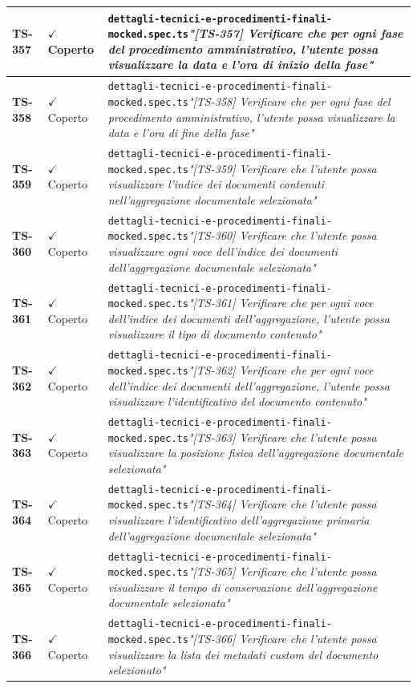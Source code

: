 \documentclass[a4paper,12pt]{article}
\newcommand{\ok}{\textcolor{green!60!black}{$\checkmark$ Coperto}}
\newcommand{\f}[1]{\nolinkurl{#1}\newline}
\newcommand{\q}[1]{\textit{#1}}
\begin{document}
\begin{longtable}{|p{1.5cm}|p{3.0cm}|p{10.5cm}|}
\textbf{TS-357} & \ok & \f{dettagli-tecnici-e-procedimenti-finali-mocked.spec.ts}\q{"[TS-357] Verificare che per ogni fase del procedimento amministrativo, l'utente possa visualizzare la data e l'ora di inizio della fase"} \\ \hline
\textbf{TS-358} & \ok & \f{dettagli-tecnici-e-procedimenti-finali-mocked.spec.ts}\q{"[TS-358] Verificare che per ogni fase del procedimento amministrativo, l'utente possa visualizzare la data e l'ora di fine della fase"} \\ \hline
\textbf{TS-359} & \ok & \f{dettagli-tecnici-e-procedimenti-finali-mocked.spec.ts}\q{"[TS-359] Verificare che l'utente possa visualizzare l'indice dei documenti contenuti nell'aggregazione documentale selezionata"} \\ \hline
\textbf{TS-360} & \ok & \f{dettagli-tecnici-e-procedimenti-finali-mocked.spec.ts}\q{"[TS-360] Verificare che l'utente possa visualizzare ogni voce dell'indice dei documenti dell'aggregazione documentale selezionata"} \\ \hline
\textbf{TS-361} & \ok & \f{dettagli-tecnici-e-procedimenti-finali-mocked.spec.ts}\q{"[TS-361] Verificare che per ogni voce dell'indice dei documenti dell'aggregazione, l'utente possa visualizzare il tipo di documento contenuto"} \\ \hline
\textbf{TS-362} & \ok & \f{dettagli-tecnici-e-procedimenti-finali-mocked.spec.ts}\q{"[TS-362] Verificare che per ogni voce dell'indice dei documenti dell'aggregazione, l'utente possa visualizzare l'identificativo del documento contenuto"} \\ \hline
\textbf{TS-363} & \ok & \f{dettagli-tecnici-e-procedimenti-finali-mocked.spec.ts}\q{"[TS-363] Verificare che l'utente possa visualizzare la posizione fisica dell'aggregazione documentale selezionata"} \\ \hline
\textbf{TS-364} & \ok & \f{dettagli-tecnici-e-procedimenti-finali-mocked.spec.ts}\q{"[TS-364] Verificare che l'utente possa visualizzare l'identificativo dell'aggregazione primaria dell'aggregazione documentale selezionata"} \\ \hline
\textbf{TS-365} & \ok & \f{dettagli-tecnici-e-procedimenti-finali-mocked.spec.ts}\q{"[TS-365] Verificare che l'utente possa visualizzare il tempo di conservazione dell'aggregazione documentale selezionata"} \\ \hline
\textbf{TS-366} & \ok & \f{dettagli-tecnici-e-procedimenti-finali-mocked.spec.ts}\q{"[TS-366] Verificare che l'utente possa visualizzare la lista dei metadati custom del documento selezionato"} \\ \hline

\end{longtable}
\end{document}
